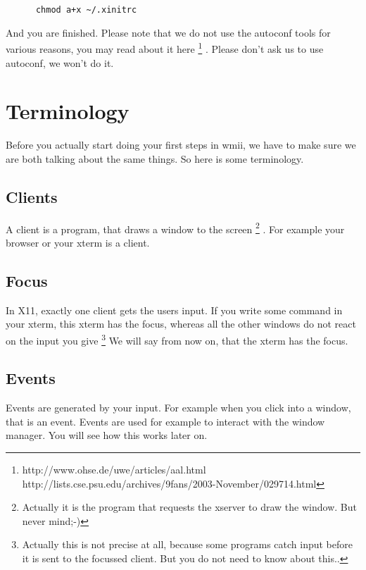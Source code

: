 \documentclass[12pt,a4paper]{article}
\begin{document}
    \begin{verbatim}
      chmod a+x ~/.xinitrc
    \end{verbatim}

    And you are finished. Please note that we do not use the autoconf
    tools for various reasons, you may read about it here
    \footnote{
      http://www.ohse.de/uwe/articles/aal.html \linebreak[4]
      http://lists.cse.psu.edu/archives/9fans/2003-November/029714.html
      } . Please don't ask us to use autoconf, we won't do it.

\section{Terminology}
  
  Before you actually start doing your first steps in wmii, we have to
  make sure we are both talking about the same things. So here is some
  terminology.

  \subsection{Clients}

    A client is a program, that draws a window to the
    screen 
    \footnote{Actually it is the program that requests the xserver
      to draw the window. But never mind;-)}
    . For example your browser or your xterm is a client.
  
  \subsection{Focus}

    In X11, exactly one client gets the users input. If you write some
    command in your xterm, this xterm has the focus, whereas all the
    other windows do not react on the input you give
    \footnote{Actually
      this is not precise at all, because some programs catch input
      before it is sent to the focussed client. But you do not need to
      know about this..}
    We will say from now on, that the xterm has the
    focus.
  
  \subsection{Events}

    Events are generated by your input. For example when you click
    into a window, that is an event. Events are used for example to
    interact with the window manager. You will see how this works
    later on.
  
\end{document}
